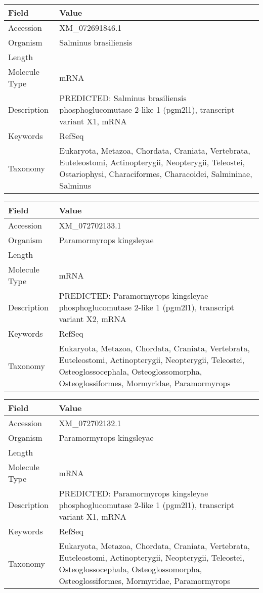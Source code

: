 \documentclass[10pt]{article}
\begin{document}
\vspace{1em}
{\footnotesize
\begin{longtable}{>{\raggedright\arraybackslash}p{4.5cm} >{\raggedright\arraybackslash}p{11.5cm}}
\textbf{Field} & \textbf{Value} \\
\hline
Accession & XM\_072691846.1 \\
Organism & Salminus brasiliensis \\
Length & 4322 \\
Molecule Type & mRNA \\
Description & PREDICTED: Salminus brasiliensis phosphoglucomutase 2-like 1 (pgm2l1), transcript variant X1, mRNA \\
Keywords & RefSeq \\
Taxonomy & Eukaryota, Metazoa, Chordata, Craniata, Vertebrata, Euteleostomi, Actinopterygii, Neopterygii, Teleostei, Ostariophysi, Characiformes, Characoidei, Salmininae, Salminus \\
\end{longtable}
}

\vspace{1em}
{\footnotesize
\begin{longtable}{>{\raggedright\arraybackslash}p{4.5cm} >{\raggedright\arraybackslash}p{11.5cm}}
\textbf{Field} & \textbf{Value} \\
\hline
Accession & XM\_072702133.1 \\
Organism & Paramormyrops kingsleyae \\
Length & 5964 \\
Molecule Type & mRNA \\
Description & PREDICTED: Paramormyrops kingsleyae phosphoglucomutase 2-like 1 (pgm2l1), transcript variant X2, mRNA \\
Keywords & RefSeq \\
Taxonomy & Eukaryota, Metazoa, Chordata, Craniata, Vertebrata, Euteleostomi, Actinopterygii, Neopterygii, Teleostei, Osteoglossocephala, Osteoglossomorpha, Osteoglossiformes, Mormyridae, Paramormyrops \\
\end{longtable}
}

\vspace{1em}
{\footnotesize
\begin{longtable}{>{\raggedright\arraybackslash}p{4.5cm} >{\raggedright\arraybackslash}p{11.5cm}}
\textbf{Field} & \textbf{Value} \\
\hline
Accession & XM\_072702132.1 \\
Organism & Paramormyrops kingsleyae \\
Length & 6039 \\
Molecule Type & mRNA \\
Description & PREDICTED: Paramormyrops kingsleyae phosphoglucomutase 2-like 1 (pgm2l1), transcript variant X1, mRNA \\
Keywords & RefSeq \\
Taxonomy & Eukaryota, Metazoa, Chordata, Craniata, Vertebrata, Euteleostomi, Actinopterygii, Neopterygii, Teleostei, Osteoglossocephala, Osteoglossomorpha, Osteoglossiformes, Mormyridae, Paramormyrops \\
\end{longtable}
}
\end{document}
